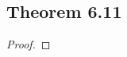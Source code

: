 \documentclass[../../main.tex]{subfiles}
\begin{document}
\subsection{Theorem 6.11}
\begin{wts}

\end{wts}
\begin{proof}

\end{proof}
\end{document}
